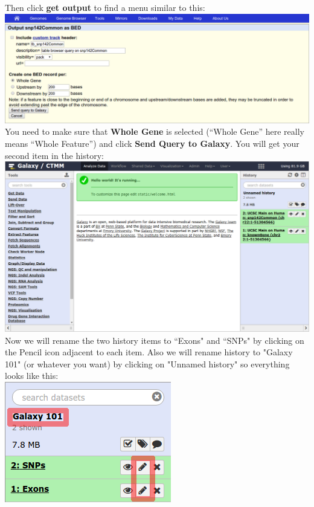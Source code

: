 \documentclass[11pt,a4paper]{article}
\begin{document}
Then click \textbf{get output} to find a menu similar to this:\\
\includegraphics[width=\textwidth]{figures/101_07}\\
You need to make sure that \textbf{Whole Gene} is selected (``Whole Gene'' here really means ``Whole Feature'') and click \textbf{Send Query to Galaxy}. You will get your second item in the history:\\
\includegraphics[width=\textwidth]{figures/101_08}\\
Now we will rename the two history items to ``Exons" and ``SNPs" by clicking on the Pencil icon adjacent to each item. Also we will rename history to "Galaxy 101" (or whatever you want) by clicking on "Unnamed history" so everything looks like this:\\
\includegraphics[scale=0.65]{figures/101_09}\\
\end{document}
